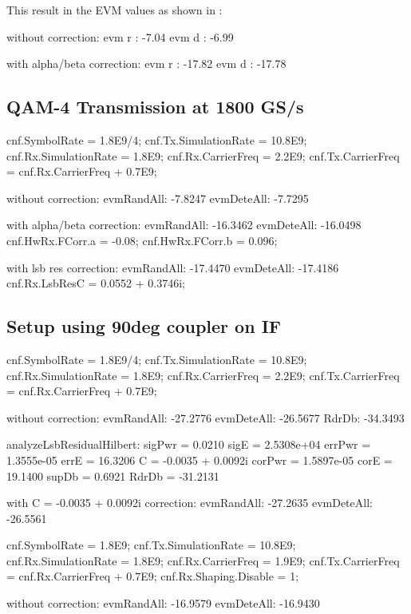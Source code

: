 This result in the EVM values as shown in :

without correction:
evm r : -7.04
evm d : -6.99

with alpha/beta correction:
evm r : -17.82
evm d : -17.78


\subsection{\gls{QAM}-4 Transmission at 1800 GS/s}
cnf.SymbolRate        = 1.8E9/4;
cnf.Tx.SimulationRate = 10.8E9;
cnf.Rx.SimulationRate = 1.8E9;
cnf.Rx.CarrierFreq    = 2.2E9;
cnf.Tx.CarrierFreq    = cnf.Rx.CarrierFreq + 0.7E9;

without correction:
evmRandAll: -7.8247
evmDeteAll: -7.7295

with alpha/beta correction:
evmRandAll: -16.3462
evmDeteAll: -16.0498
cnf.HwRx.FCorr.a = -0.08;
cnf.HwRx.FCorr.b = 0.096;

with lsb res correction:
evmRandAll: -17.4470
evmDeteAll: -17.4186
cnf.Rx.LsbResC = 0.0552 + 0.3746i;

\subsection{Setup using 90deg coupler on IF}

cnf.SymbolRate        = 1.8E9/4;
cnf.Tx.SimulationRate = 10.8E9;
cnf.Rx.SimulationRate = 1.8E9;
cnf.Rx.CarrierFreq    = 2.2E9;
cnf.Tx.CarrierFreq    = cnf.Rx.CarrierFreq + 0.7E9;

without correction:
evmRandAll: -27.2776
evmDeteAll: -26.5677
RdrDb: -34.3493

analyzeLsbResidualHilbert:
sigPwr = 0.0210
sigE =  2.5308e+04
errPwr =  1.3555e-05
errE =  16.3206
C = -0.0035 + 0.0092i
corPwr =  1.5897e-05
corE = 19.1400
supDb =  0.6921
RdrDb = -31.2131

with C = -0.0035 + 0.0092i correction:
    evmRandAll: -27.2635
    evmDeteAll: -26.5561

cnf.SymbolRate        = 1.8E9;
cnf.Tx.SimulationRate = 10.8E9;
cnf.Rx.SimulationRate = 1.8E9;
cnf.Rx.CarrierFreq    = 1.9E9;
cnf.Tx.CarrierFreq    = cnf.Rx.CarrierFreq + 0.7E9;
cnf.Rx.Shaping.Disable = 1;

without correction:
    evmRandAll: -16.9579
    evmDeteAll: -16.9430

